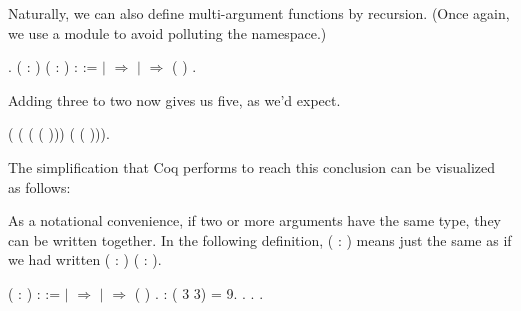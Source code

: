 \documentclass[12pt]{report}
\begin{document}
Naturally, we can also define multi-argument functions by
    recursion.  (Once again, we use a module to avoid polluting the
    namespace.) \begin{coqdoccode}
\coqdocemptyline
\coqdocnoindent
{} .\coqdoceol
\coqdocemptyline
\coqdocnoindent
{}  ( : ) ( : ) :  :=\coqdoceol
\coqdocindent{1.00em}
  \coqdoceol
\coqdocindent{2.00em}
\ensuremath{|}  \ensuremath{\Rightarrow} \coqdoceol
\coqdocindent{2.00em}
\ensuremath{|}   \ensuremath{\Rightarrow}  (  )\coqdoceol
\coqdocindent{1.00em}
.\coqdoceol
\coqdocemptyline
\end{coqdoccode}
Adding three to two now gives us five, as we'd expect. \begin{coqdoccode}
\coqdocemptyline
\coqdocnoindent
{}   ( ( ( ( ))) ( ( ))).\coqdoceol
\coqdocemptyline
\end{coqdoccode}
The simplification that Coq performs to reach this conclusion can
    be visualized as follows: \begin{coqdoccode}
\coqdocemptyline
\coqdocemptyline
\end{coqdoccode}
As a notational convenience, if two or more arguments have
    the same type, they can be written together.  In the following
    definition, (  : ) means just the same as if we had written
    ( : ) ( : ). \begin{coqdoccode}
\coqdocemptyline
\coqdocnoindent
{}  (  : ) :  :=\coqdoceol
\coqdocindent{1.00em}
  \coqdoceol
\coqdocindent{2.00em}
\ensuremath{|}  \ensuremath{\Rightarrow} \coqdoceol
\coqdocindent{2.00em}
\ensuremath{|}   \ensuremath{\Rightarrow}   (  )\coqdoceol
\coqdocindent{1.00em}
.\coqdoceol
\coqdocemptyline
\coqdocnoindent
{} : ( 3 3) = 9.\coqdoceol
\coqdocnoindent
{}. . .\coqdoceol
\coqdocemptyline
\end{coqdoccode}
\end{document}
